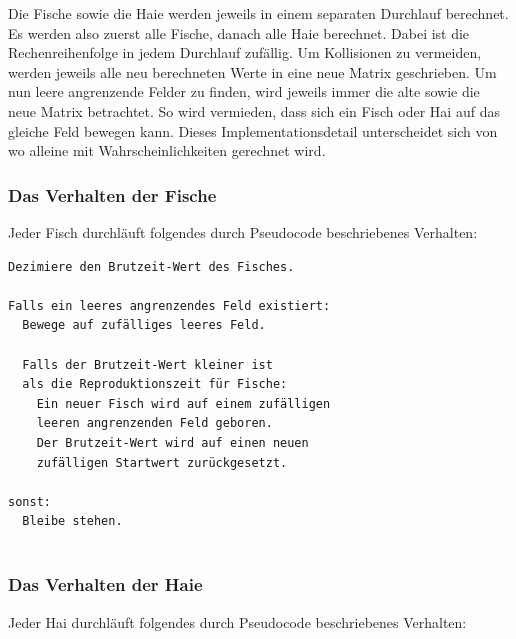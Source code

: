\documentclass[a4paper,twoside]{article}
\begin{document}
	Die Fische sowie die Haie werden jeweils in einem separaten Durchlauf berechnet. Es werden also zuerst alle Fische, danach alle Haie berechnet. Dabei ist die Rechenreihenfolge in jedem Durchlauf zufällig. Um Kollisionen zu vermeiden, werden jeweils alle neu berechneten Werte in eine neue Matrix geschrieben. Um nun leere angrenzende Felder zu finden, wird jeweils immer die alte sowie die neue Matrix betrachtet. So wird vermieden, dass sich ein Fisch oder Hai auf das gleiche Feld bewegen kann. Dieses Implementationsdetail unterscheidet sich von \cite{PlanetWator} wo alleine mit Wahrscheinlichkeiten gerechnet wird.
	
	
	\subsubsection{Das Verhalten der Fische}
	Jeder Fisch durchläuft folgendes durch Pseudocode beschriebenes Verhalten:

	\begin{small}
	\begin{verbatim}
Dezimiere den Brutzeit-Wert des Fisches.
 		
Falls ein leeres angrenzendes Feld existiert:
  Bewege auf zufälliges leeres Feld.
 			
  Falls der Brutzeit-Wert kleiner ist
  als die Reproduktionszeit für Fische:
    Ein neuer Fisch wird auf einem zufälligen
    leeren angrenzenden Feld geboren.
    Der Brutzeit-Wert wird auf einen neuen
    zufälligen Startwert zurückgesetzt.
 			
sonst:
  Bleibe stehen. 		
 		
	\end{verbatim}
	\end{small}
	
	\subsubsection{Das Verhalten der Haie}
	Jeder Hai durchläuft folgendes durch Pseudocode beschriebenes Verhalten:
\end{document}
